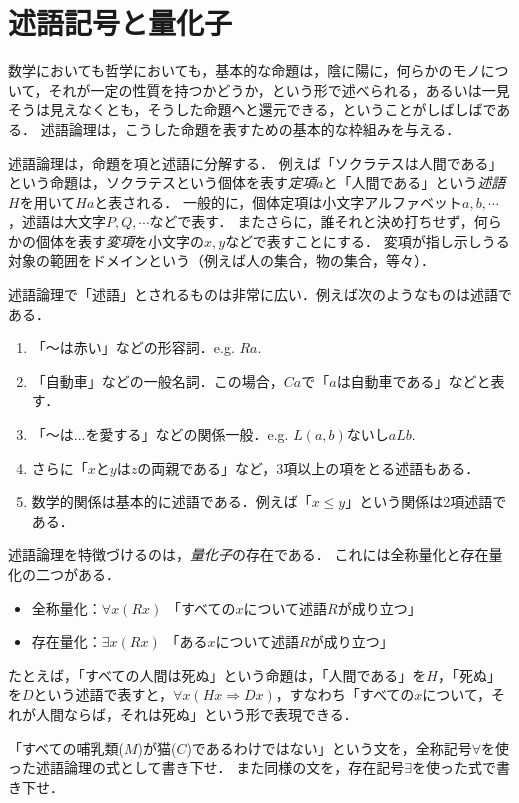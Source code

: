 \documentclass[11pt,a4paper]{jsarticle}
\begin{document}
\section{述語記号と量化子}
数学においても哲学においても，基本的な命題は，陰に陽に，何らかのモノについて，それが一定の性質を持つかどうか，という形で述べられる，あるいは一見そうは見えなくとも，そうした命題へと還元できる，ということがしばしばである．
述語論理は，こうした命題を表すための基本的な枠組みを与える．

述語論理は，命題を項と述語に分解する．
例えば「ソクラテスは人間である」という命題は，ソクラテスという個体を表す\emph{定項}$a$と「人間である」という\emph{述語}$H$を用いて$Ha$と表される．
一般的に，個体定項は小文字アルファベット$a, b, \cdots$，述語は大文字$P, Q, \cdots$などで表す．
またさらに，誰それと決め打ちせず，何らかの個体を表す\emph{変項}を小文字の$x, y$などで表すことにする． 
変項が指し示しうる対象の範囲をドメインという（例えば人の集合，物の集合，等々）．

述語論理で「述語」とされるものは非常に広い．例えば次のようなものは述語である．
\begin{enumerate}
    \item 「〜は赤い」などの形容詞．e.g. $Ra$.
    \item 「自動車」などの一般名詞．この場合，$Ca$で「$a$は自動車である」などと表す．
    \item 「〜は...を愛する」などの関係一般．e.g. $L(a,b)$ないし$aLb$. 
    \item さらに「$x$と$y$は$z$の両親である」など，3項以上の項をとる述語もある．
    \item 数学的関係は基本的に述語である．例えば「$x \leq y$」という関係は2項述語である．
\end{enumerate}

述語論理を特徴づけるのは，\emph{量化子}の存在である．
これには全称量化と存在量化の二つがある．
\begin{itemize}
 \item 全称量化：$\forall x (Rx)$ 「すべての$x$について述語$R$が成り立つ」
 \item 存在量化：$\exists x (Rx)$ 「ある$x$について述語$R$が成り立つ」
\end{itemize}
たとえば，「すべての人間は死ぬ」という命題は，「人間である」を$H$，「死ぬ」を$D$という述語で表すと，$\forall x (Hx \Rightarrow Dx)$，すなわち「すべての$x$について，それが人間ならば，それは死ぬ」という形で表現できる．

\begin{exercise}
    「すべての哺乳類($M$)が猫($C$)であるわけではない」という文を，全称記号$\forall$を使った述語論理の式として書き下せ．    また同様の文を，存在記号$\exists$を使った式で書き下せ．
\end{exercise}
\end{document}
